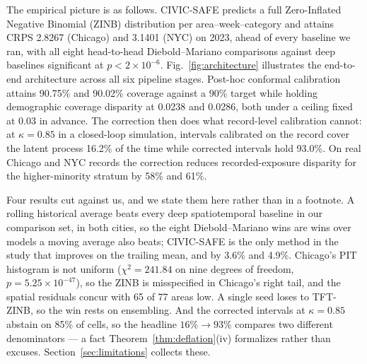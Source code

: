 \documentclass[journal,10pt,twocolumn]{IEEEtran}
\begin{document}
The empirical picture is as follows. CIVIC-SAFE predicts a full Zero-Inflated
Negative Binomial (ZINB) distribution per area--week--category and attains CRPS
2.8267 (Chicago) and 3.1401 (NYC) on 2023, ahead of every baseline we ran, with
all eight head-to-head Diebold--Mariano comparisons against deep baselines
significant at $p < 2\times10^{-6}$. Fig.~\ref{fig:architecture} illustrates the
end-to-end architecture across all six pipeline stages. Post-hoc conformal
calibration attains 90.75\% and 90.02\% coverage against a 90\% target while
holding demographic coverage disparity at 0.0238 and 0.0286, both under a ceiling
fixed at 0.03 in advance. The correction then does what record-level calibration
cannot: at $\kappa = 0.85$ in a closed-loop simulation, intervals calibrated on the
record cover the latent process 16.2\% of the time while corrected intervals hold
93.0\%. On real Chicago and NYC records the correction reduces
recorded-exposure disparity for the higher-minority stratum by 58\% and 61\%.

Four results cut against us, and we state them here rather than in a footnote.
A rolling historical average beats every deep spatiotemporal baseline in our
comparison set, in both cities, so the eight Diebold--Mariano wins are wins over
models a moving average also beats; CIVIC-SAFE is the only method in the study
that improves on the trailing mean, and by 3.6\% and 4.9\%. Chicago's PIT
histogram is not uniform ($\chi^2 = 241.84$ on nine degrees of freedom,
$p = 5.25 \times 10^{-47}$), so the ZINB is misspecified in Chicago's right tail,
and the spatial residuals concur with 65 of 77 areas low. A single seed loses to
TFT-ZINB, so the win rests on ensembling. And the corrected intervals at
$\kappa = 0.85$ abstain on 85\% of cells, so the headline $16\% \to 93\%$ compares
two different denominators --- a fact Theorem~\ref{thm:deflation}(iv) formalizes
rather than excuses. Section~\ref{sec:limitations} collects these.
\end{document}

